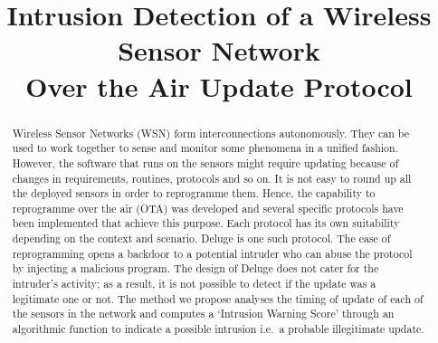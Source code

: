 \documentclass[conference,final]{IEEEtran}
\begin{document}
\title{Intrusion Detection of a Wireless Sensor Network\\Over the Air Update Protocol}


\author{
}

\maketitle

\begin{abstract}


Wireless Sensor Networks (WSN) form interconnections autonomously. They can be used to work together to sense and monitor some phenomena in a unified fashion. 
However, the software that runs on the sensors might require updating because of changes in requirements, routines, protocols and so on. 
It is not easy to round up all the deployed sensors in order to reprogramme them. 
Hence, the capability to reprogramme over the air (OTA) was developed and several specific protocols have been implemented that achieve this purpose. 
Each protocol has its own suitability depending on the context and scenario.
Deluge is one such protocol. %
The ease of reprogramming opens a backdoor to a potential intruder who can abuse the protocol by injecting a malicious program. 
The design of Deluge does not cater for the intruder's activity; as a result, it is not possible to detect if the update was a legitimate one or not. 
The method we propose analyses the timing of update of each of the sensors in the network and computes a `Intrusion Warning Score' through an algorithmic function to indicate a possible intrusion i.e.\ a probable illegitimate update. 

\end{abstract}
\end{document}
